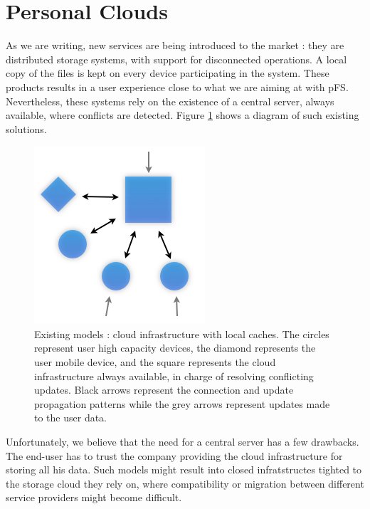 
\section{Personal Clouds}
\label{sec:model}

As we are writing, new services are being introduced to the
market : they are distributed storage systems, with support for
disconnected operations. A local copy of the files is kept on every
device participating in the system. These products results in a user
experience close to what we are aiming at with pFS. Nevertheless, these
systems rely on the existence of a central server, always available,
where conflicts are detected. Figure \ref{OthModel} shows a diagram of
such existing solutions.

\begin{figure}[ht]
\begin{center}
  \includegraphics [scale=0.5] {img/other_model}
  \caption{\label{OthModel}
    {\small Existing models : cloud infrastructure with local
      caches. The circles represent user high capacity devices, the
      diamond represents the user mobile device, and the square
      represents the cloud infrastructure always available, in charge
      of resolving conflicting updates. Black arrows represent the
      connection and update propagation patterns while the grey arrows
      represent updates made to the user data.}}
\end{center}
\end{figure}

Unfortunately, we believe that the need for a central server has a few
drawbacks. The end-user has to trust the company providing the cloud
infrastructure for storing all his data. Such models might
result into closed infratstructes tighted to the storage cloud
they rely on, where compatibility or migration between different
service providers might become difficult.

